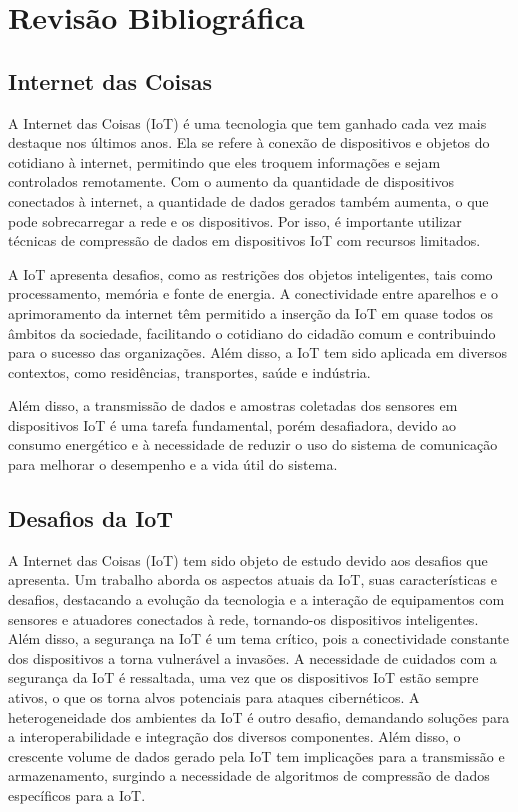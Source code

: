 \chapter{Revisão Bibliográfica}
\label{cap:revisao}

\section{Internet das Coisas}
\label{sec:InternetDasCoisas}

A Internet das Coisas (IoT) é uma tecnologia que tem ganhado cada vez mais destaque nos últimos anos. Ela se refere à conexão de dispositivos e objetos do cotidiano à internet, permitindo que eles troquem informações e sejam controlados remotamente. Com o aumento da quantidade de dispositivos conectados à internet, a quantidade de dados gerados também aumenta, o que pode sobrecarregar a rede e os dispositivos. Por isso, é importante utilizar técnicas de compressão de dados em dispositivos IoT com recursos limitados.

A IoT apresenta desafios, como as restrições dos objetos inteligentes, tais como processamento, memória e fonte de energia\cite{sampaio}. A conectividade entre aparelhos e o aprimoramento da internet têm permitido a inserção da IoT em quase todos os âmbitos da sociedade, facilitando o cotidiano do cidadão comum e contribuindo para o sucesso das organizações\cite{ricardo}. Além disso, a IoT tem sido aplicada em diversos contextos, como residências, transportes, saúde e indústria\cite{sampaio}.

Além disso, a transmissão de dados e amostras coletadas dos sensores em dispositivos IoT é uma tarefa fundamental, porém desafiadora, devido ao consumo energético e à necessidade de reduzir o uso do sistema de comunicação para melhorar o desempenho e a vida útil do sistema\cite{barros}.

\section{Desafios da IoT}
\label{sec:DesafiosDaIoT}

A Internet das Coisas (IoT) tem sido objeto de estudo devido aos desafios que apresenta. Um trabalho aborda os aspectos atuais da IoT, suas características e desafios, destacando a evolução da tecnologia e a interação de equipamentos com sensores e atuadores conectados à rede, tornando-os dispositivos inteligentes\cite{sol}. Além disso, a segurança na IoT é um tema crítico, pois a conectividade constante dos dispositivos a torna vulnerável a invasões. A necessidade de cuidados com a segurança da IoT é ressaltada, uma vez que os dispositivos IoT estão sempre ativos, o que os torna alvos potenciais para ataques cibernéticos\cite{ricardo}\cite{conexoes}. A heterogeneidade dos ambientes da IoT é outro desafio, demandando soluções para a interoperabilidade e integração dos diversos componentes\cite{scielo}. Além disso, o crescente volume de dados gerado pela IoT tem implicações para a transmissão e armazenamento, surgindo a necessidade de algoritmos de compressão de dados específicos para a IoT\cite{ricardo}.

